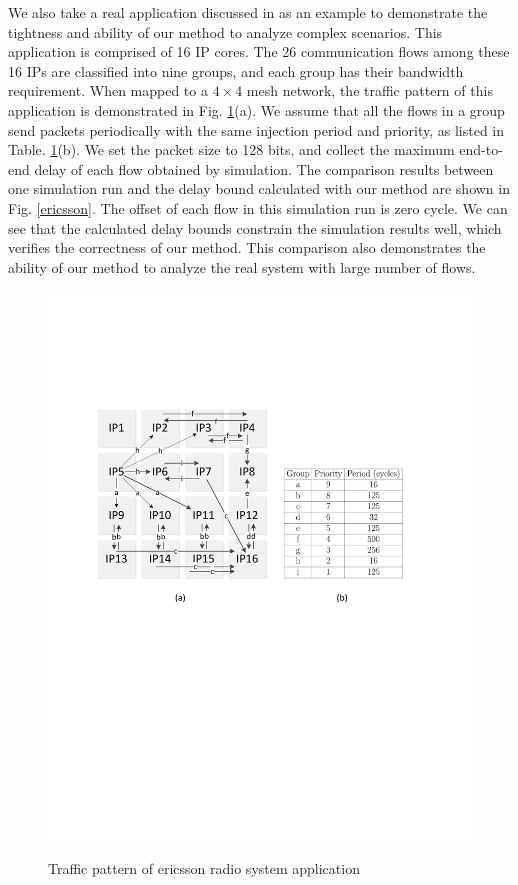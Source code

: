 \documentclass[preprint]{elsarticle}
\begin{document}
We also take a real application discussed in \cite{LuJa08}\cite{Jafari1922089} as an example to demonstrate the tightness and ability of our method to analyze complex scenarios. This application is comprised of 16 IP cores. The 26 communication flows among these 16 IPs are classified into nine groups, and each group has their bandwidth requirement. When mapped to a $4\times 4$ mesh network, the traffic pattern of this application is demonstrated in Fig. \ref{trafficpattern}(a). We assume that all the flows in a group send packets periodically with the same injection period and priority, as listed in Table. \ref{trafficpattern}(b). We set the packet size to 128 bits, and collect the maximum end-to-end delay of each flow obtained by simulation. The comparison results between one simulation run and the delay bound calculated  with our method are shown in Fig. \ref{ericsson}. The offset of each flow in this simulation run is zero cycle. We can see that the calculated delay bounds constrain the simulation results well, which verifies the correctness of our method. This comparison also demonstrates the ability of our method to analyze the real system with large number of flows.
\begin{figure}
  \centering
  \includegraphics[scale=0.7]{figures/trafficpattern.pdf}\\
  \caption{Traffic pattern of ericsson radio system application}\label{trafficpattern}
\end{figure}
\end{document}
